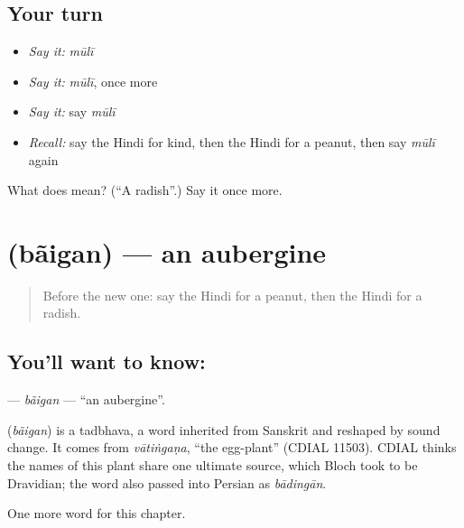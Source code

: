 \subsection*{Your turn}
\begin{itemize}
\raggedright
  \item \emph{Say it:} \emph{mūlī}
  \item \emph{Say it:} \emph{mūlī}, once more
  \item \emph{Say it:} say \emph{mūlī}
  \item \emph{Recall:} say the Hindi for kind, then the Hindi for a peanut, then say \emph{mūlī} again
\end{itemize}

\begin{tcolorbox}[breakable,colback=teal!4,colframe=teal!35!black,title={Before you move on}]
What does  mean? (\textquotedblleft{}A radish\textquotedblright{}.) Say it once more.
\end{tcolorbox}
\section[\texorpdfstring{\hi{बैंगन} (bãigan)}{बैंगन (bãigan)}]{ (bãigan) — an aubergine}

\label{lesson:HI-C216-baigan}



\begin{quote}
Before the new one: say the Hindi for a peanut, then the Hindi for a radish.
\end{quote}

\subsection*{You'll want to know: }
\textbf{} — \emph{bãigan} — \textquotedblleft{}an aubergine\textquotedblright{}.

\begin{cousinweb}
\textbf{} (\emph{bãigan}) is a tadbhava, a word inherited from Sanskrit and reshaped by sound change. It comes from \emph{vātiṅgaṇa}, \textquotedblleft{}the egg-plant\textquotedblright{} (CDIAL 11503). CDIAL thinks the names of this plant share one ultimate source, which Bloch took to be Dravidian; the word also passed into Persian as \emph{bādingān}.
\end{cousinweb}

\begin{grammarlens}[title={What you've built}]
One more word for this chapter.
\end{grammarlens}

